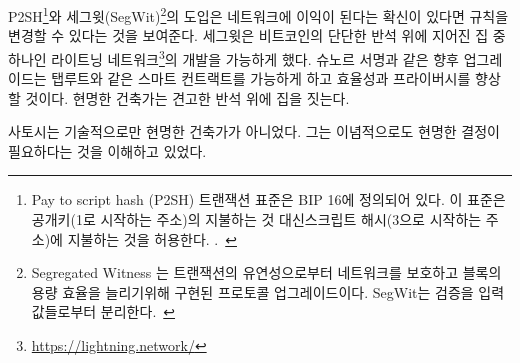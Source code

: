 \begin{comment}
	The introduction of pay to script hash\footnote{ Pay to script hash (P2SH)
		transactions were standardised in BIP 16. They allow transactions to be sent to
		a script hash (address starting with 3) instead of a public key hash (addresses
		starting with 1).~\cite{btcwiki:p2sh}} and segregated
	witness\footnote{Segregated Witness (abbreviated as SegWit) is an implemented
		protocol upgrade intended to provide protection from transaction malleability
		and increase block capacity. SegWit separates the \textit{witness} from the list
		of inputs.~\cite{btcwiki:segwit}} are proof that Bitcoin's rules can be changed
	if enough users are convinced that adopting said change is to the benefit of the
	network. The latter enabled the development of the lightning
	network\footnote{\url{https://lightning.network/}}, which is one of the houses
	being built on Bitcoin's solid foundation. Future upgrades like Schnorr
	signatures~\cite{bip:schnorr} will enhance efficiency and privacy, as well as
	scripts (read: smart contracts) which will be indistinguishable from regular
	transactions thanks to Taproot~\cite{taproot}. Wise builders do indeed build on
	solid foundations.
\end{comment}
P2SH\footnote{Pay to script hash (P2SH)
	트랜잭션 표준은 BIP 16에 정의되어 있다. 이 표준은 공개키(1로 시작하는 주소)의 지불하는 것 대신스크립트 해시(3으로 시작하는 주소)에 지불하는 것을 허용한다.
	.~\cite{btcwiki:p2sh}}와
세그윗(SegWit)\footnote{Segregated Witness 는
	트랜잭션의 유연성으로부터 네트워크를 보호하고 블록의 용량 효율을 늘리기위해 구현된 프로토콜 업그레이드이다.
	SegWit는 검증을 입력값들로부터 분리한다.~\cite{btcwiki:segwit}}의 도입은
네트워크에 이익이 된다는 확신이 있다면 규칙을 변경할 수 있다는 것을 보여준다.
세그윗은 비트코인의 단단한 반석 위에 지어진 집 중 하나인 라이트닝 네트워크\footnote{\url{https://lightning.network/}}의 개발을 가능하게 했다.
슈노르 서명\cite{bip:schnorr}과 같은 향후 업그레이드는 탭루트와 같은 스마트 컨트랙트를 가능하게 하고 
효율성과 프라이버시를 향상할 것이다.
현명한 건축가는 견고한 반석 위에 집을 짓는다.
		
\begin{comment}
	Satoshi wasn't only a wise builder technologically. He also understood
	that it would be necessary to make wise decisions ideologically.
\end{comment}
사토시는 기술적으로만 현명한 건축가가 아니었다.
그는 이념적으로도 현명한 결정이 필요하다는 것을 이해하고 있었다.

